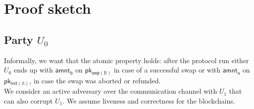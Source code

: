 \documentclass{article}      	%
\begin{document}
\section{Proof sketch}


\subsection{Party $U_0$}

Informally, we want that the atomic property holds: after the protocol run either $U_0$ ends up with $\mathsf{amnt_b}$ on $\mathsf{pk_{swp(\mathbb{B})}}$ in case of a successful swap or with $\mathsf{amnt_a}$ on $\mathsf{pk_{init(\mathbb{A})}}$, in case the swap was aborted or refunded.  \\
We consider an active adversary over the communication channel with $U_1$ that can also corrupt $U_1$. We assume liveness and correctness for the blockchains.\\
\end{document}
